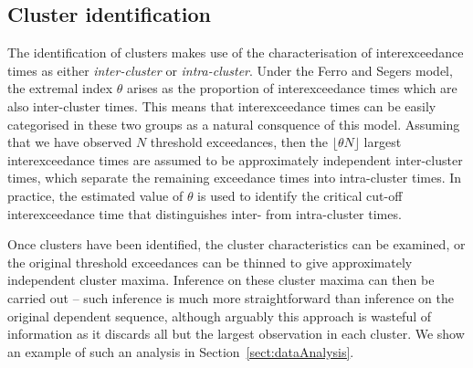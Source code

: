 \documentclass[10pt]{article}\usepackage[]{graphicx}\usepackage[]{color}
\begin{document}
\subsection{Cluster identification}
\label{sect:declustering}
%
The identification of clusters makes use of the characterisation of interexceedance times as either {\it inter-cluster} or {\it intra-cluster}.  Under the Ferro and Segers model, the extremal index $\theta$ arises as the proportion of interexceedance times which are also inter-cluster times.  This means that interexceedance times can be easily categorised in these two groups as a natural consquence of this model.  Assuming that we have observed $N$ threshold exceedances, then the $\lfloor \theta N \rfloor$ largest interexceedance times are assumed to be approximately independent inter-cluster times, which separate the remaining exceedance times into intra-cluster times.  In practice, the estimated value of $\theta$ is used to identify the critical cut-off interexceedance time that distinguishes inter- from intra-cluster times.

Once clusters have been identified, the cluster characteristics can be examined, or the original threshold exceedances can be thinned to give approximately independent cluster maxima.  Inference on these cluster maxima can then be carried out -- such inference is much more straightforward than inference on the original dependent sequence, although arguably this approach is wasteful of information as it discards all but the largest observation in each cluster.  We show an example of such an analysis in Section~\ref{sect:dataAnalysis}.
%
\end{document}
